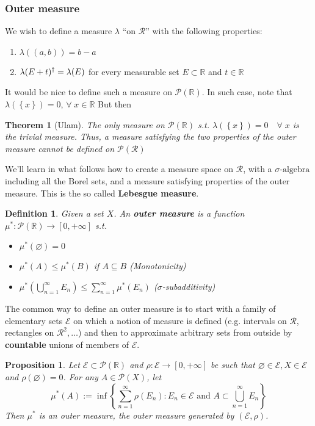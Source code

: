 \documentclass[a4paper,12pt]{article}
\theoremstyle{break}
\newtheorem{theorem}{Theorem}[section]
\newtheorem{proposition}{Proposition}[section]
\newtheorem{definition}{Definition}[section]
\let\emptyset\varnothing
\newcommand{\sigalg}{\sigma\mbox{-algebra}}
\numberwithin{equation}{section}
\begin{document}
\subsubsection*{Outer measure}
We wish to define a measure \(\lambda\) ``on \(\mathcal{R}\)'' with the following properties:
\begin{enumerate}
    \item \(\lambda((a,b)) = b-a\)
    \item \(\lambda(E + t)\symbolfootnotemark[2]  \; = \lambda(E)\) for every measurable set \(E \subset \mathbb{R}\) and \(t \in \mathbb{R}\)
\end{enumerate}
It would be nice to define such a measure on \(\mathcal{P}(\mathbb{R})\). In such case, note that \(\lambda(\left\lbrace x \right\rbrace) = 0\), \(\forall \; x \in \mathbb{R}\)
But then 
\begin{theorem}[Ulam]
    The only measure on \(\mathcal{P}(\mathbb{R})\) s.t. \(\lambda(\left\lbrace x \right\rbrace) = 0 \quad \forall \; x\) is the trivial measure. Thus, a measure satisfying the two properties of the outer measure cannot be defined on \(\mathcal{P}(\mathcal{R})\)
\end{theorem}
We'll learn in what follows how to create a measure space on \(\mathcal{R}\), with a \(\sigalg\) including all the Borel sets, and a measure satisfying properties of the outer measure. This is the so called \textbf{Lebesgue measure}.
\begin{definition}
    Given a set \(X\). An \textbf{outer measure} is a function \(\mu^* : \mathcal{P}(\mathbb{R}) \to [0, +\infty]\) s.t. 
    \begin{itemize}
        \item \(\mu^*(\emptyset) = 0\)
        \item \(\mu^*(A) \leq \mu^*(B)\) if \(A \subseteq B\) (Monotonicity)
        \item \(\mu^*(\bigcup_{n=1}^{\infty} E_n) \leq \sum_{n=1}^{\infty} \mu^*(E_n)\) (\(\sigma\)-subadditivity)
    \end{itemize}
\end{definition}
The common way to define an outer measure is to start with a family of elementary sets \(\mathcal{E}\) on which a notion of measure is defined (e.g. intervals on \(\mathcal{R}\), rectangles on \(\mathcal{R}^2, \ldots\)) and then to approximate arbitrary sets from outside by \textbf{countable} unions of members of \(\mathcal{E}\).
\begin{proposition}
    Let \(\mathcal{E} \subset \mathcal{P}(\mathbb{R})\) and \(\rho : \mathcal{E} \to [0, +\infty]\) be such that \(\emptyset \in \mathcal{E}, X \in \mathcal{E}\) and \(\rho(\emptyset) = 0\). For any \(A \in \mathcal{P}(X)\), let 
    \[\mu^*(A) := \inf \left\lbrace \sum_{n=1}^{\infty} \rho (E_n) : E_n \in \mathcal{E} \mbox{ and } A \subset \bigcup_{n=1}^{\infty} E_n \right\rbrace\]
    Then \(\mu^*\) is an outer measure, the outer measure generated by \((\mathcal{E}, \rho)\).
\end{proposition}
\end{document}
